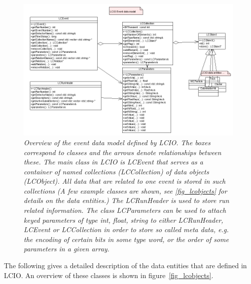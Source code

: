 \documentclass[twoside]{article}
\newcommand{\captionstyle}[1]{\textit{\small{#1}}}
\begin{document}
\begin{figure}
\includegraphics[width=150mm]{eventdata}    
\caption{\captionstyle{Overview of the event data model defined by LCIO.
The boxes correspond to classes and the arrows denote relationships between these. The main class in LCIO 
is LCEvent that serves as a container of named collections (LCCollection) of data objects (LCObject).
All data that are related to one event is stored in such collections (A few example classes are shown, see 
\ref{fig_lcobjects} for details on the data entities.) The LCRunHeader is used to store run related 
information. The class LCParameters can be used to attach keyed parameters of type \textit{int, float, string}
to either LCRunHeader, LCEvent or LCCollection in order to store so called meta data, e.g. the encoding of certain 
bits in some type word, or the order of some parameters in a given array.\label{fig_eventdata}
}}
\end{figure}

The following gives a detailed description of the data entities that are defined in LCIO. An overview of 
these classes is shown in figure~\ref{fig_lcobjects}.
\end{document}
